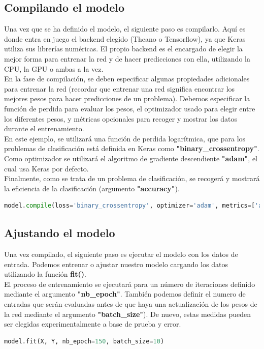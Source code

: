 \subsection{Compilando el modelo}
Una vez que se ha definido el modelo, el siguiente paso es compilarlo. Aquí es donde entra en juego el backend elegido (Theano o Tensorflow), ya que Keras utiliza sus librerías numéricas. El propio backend es el encargado de elegir la mejor forma para entrenar la red y de hacer predicciones con ella, utilizando la CPU, la GPU o ambas a la vez.\\
En la fase de compilación, se deben especificar algunas propiedades adicionales para entrenar la red (recordar que entrenar una red significa encontrar los mejores pesos para hacer predicciones de un problema). Debemos especificar la función de perdida para evaluar los pesos, el optimizador usado para elegir entre los diferentes pesos, y métricas opcionales para recoger y mostrar los datos durante el entrenamiento.\\
En este ejemplo, se utilizará una función de perdida logarítmica, que para los problemas de clasificación está definida en Keras como \textbf{"binary\_crossentropy"}. Como optimizador se utilizará el algoritmo de gradiente descendiente \textbf{"adam"}, el cual usa Keras por defecto.\\
Finalmente, como se trata de un problema de clasificación, se recogerá y mostrará la eficiencia de la clasificación (argumento \textbf{"accuracy"}).

\begin{lstlisting}[language=Python]
model.compile(loss='binary_crossentropy', optimizer='adam', metrics=['accuracy'])
\end{lstlisting}

\subsection{Ajustando el modelo}
Una vez compilado, el siguiente paso es ejecutar el modelo con los datos de entrada. Podemos entrenar o ajustar nuestro modelo cargando los datos utilizando la función \textbf{fit()}.\\
El proceso de entrenamiento se ejecutará para un número de iteraciones definido mediante el argumento \textbf{"nb\_epoch"}. También podemos definir el numero de entradas que serán evaluadas antes de que haya una actualización de los pesos de la red mediante el argumento \textbf{"batch\_size"}). De nuevo, estas medidas pueden ser elegidas experimentalmente a base de prueba y error.
\begin{lstlisting}[language=Python]
model.fit(X, Y, nb_epoch=150, batch_size=10)
\end{lstlisting}

